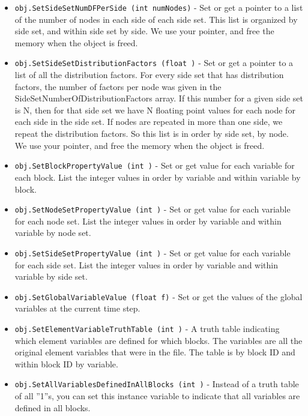 \begin{itemize}
\item  \verb|obj.SetSideSetNumDFPerSide (int numNodes)| -    Set or get a pointer to a list of the number of nodes in each
   side of each side set.  This list is organized by side set, and
   within side set by side.
   We use your pointer, and free the memory when the object is freed.

\item  \verb|obj.SetSideSetDistributionFactors (float )| -    Set or get a pointer to a list of all the distribution factors.
   For every side set that has distribution factors, the number of
   factors per node was given in the SideSetNumberOfDistributionFactors
   array.  If this number for a given side set is N, then for that
   side set we have N floating point values for each node for each
   side in the side set.  If nodes are repeated in more than one
   side, we repeat the distribution factors.  So this list is in order
   by side set, by node.
   We use your pointer, and free the memory when the object is freed.

\item  \verb|obj.SetBlockPropertyValue (int )| -    Set or get value for each variable for each block.  List
   the integer values in order by variable and within variable
   by block.

\item  \verb|obj.SetNodeSetPropertyValue (int )| -    Set or get value for each variable for each node set.  List
   the integer values in order by variable and within variable
   by node set.

\item  \verb|obj.SetSideSetPropertyValue (int )| -    Set or get value for each variable for each side set.  List
   the integer values in order by variable and within variable
   by side set.

\item  \verb|obj.SetGlobalVariableValue (float f)| -    Set or get the values of the global variables at the current
   time step.

\item  \verb|obj.SetElementVariableTruthTable (int )| -    A truth table indicating which element variables are
   defined for which blocks. The variables are all the original
   element variables that were in the file.
   The table is by block ID and within block ID by variable.

\item  \verb|obj.SetAllVariablesDefinedInAllBlocks (int )| -    Instead of a truth table of all ''1''s, you can set this
   instance variable to indicate that all variables are
   defined in all blocks.


\end{itemize}
